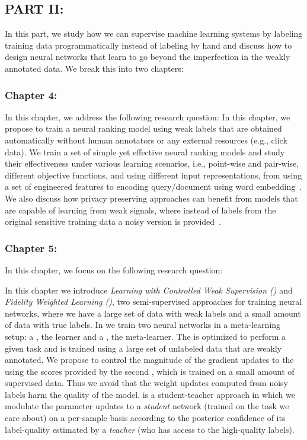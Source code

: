 \subsection*{PART II: }
In this part, we study how we can supervise machine learning systems by labeling training data programmatically instead of labeling by hand and discuss how to design neural networks that learn to go beyond the imperfection in the weakly annotated data. We break this into two chapters:

\subsubsection*{Chapter 4: }
In this chapter, we address the following research question:
In this chapter, we propose to train a neural ranking model using weak labels that are obtained automatically without human annotators or any external resources (e.g., click data). We train a set of simple yet effective neural ranking models and study their effectiveness under various learning scenarios, i.e., point-wise and pair-wise, different objective functions, and using different input representations, from using a set of engineered features to encoding query/document using word embedding~\citep{Dehghani:2017:SIGIR}. We also discuss how privacy preserving approaches can benefit from models that are capable of learning from weak signals, where instead of labels from the original sensitive training data a noisy version is provided~\citep{dehghani:2017:neuir}.

\subsubsection*{Chapter 5: }
In this chapter, we focus on the following research question:

In this chapter we introduce \emph{Learning with Controlled Weak Supervision (\cws)} and \emph{Fidelity Weighted Learning (\fwl)}, two semi-supervised approaches for training neural networks, where we have a large set of data with weak labels and a small amount of data with true labels. 
%
In \cws we train two neural networks in a meta-learning setup: a \tnet, the learner and a \cnet, the meta-learner.  The \tnet is optimized to perform a given task and is trained using a large set of unlabeled data that are weakly annotated. We propose to control the magnitude of the gradient updates to the \tnet using the scores provided by the second \cnet, which is trained on a small amount of supervised data. Thus we avoid that the weight updates computed from noisy labels harm the quality of the \tnet model.
%
\fwl is a student-teacher approach in which we modulate the parameter updates to a \emph{student} network (trained on the task we care about) on a per-sample basis according to the posterior confidence of its label-quality estimated by a \emph{teacher} (who has access to the high-quality labels).  

